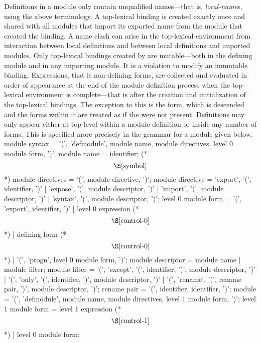 %
\begin{optDefinition}
Definitions in a module only contain unqualified names---that is, {\em
    local-name}s, using the above terminology.  A top-lexical binding is created
exactly once and shared with all modules that import its exported name from the
module that created the binding.  A name clash can arise in the top-lexical
environment from interaction between local definitions and between local
definitions and imported modules.  Only top-lexical bindings created by
 are mutable---both in the defining module and in any
importing module.  It is a violation to modify an immutable binding.
Expressions, that is non-defining forms, are collected and evaluated in order of
appearance at the end of the module definition process when the top-lexical
environment is complete---that is after the creation and initialization of the
top-lexical bindings.  The exception to this is the  form,
which is descended and the forms within it are treated as if the
 were not present.  Definitions may only appear either at
top-level within a module definition or inside any number of 
forms.  This is specified more precisely in the grammar for a module given
below.
%
\Syntax
\savesyntax{}\vbox
{\small%
\syntax
module syntax
   = '(', 'defmodule', module name,
     module directives, {level 0 module form}, ')';
module name
   = identifier; (* \[\S\ref{symbol}\] *)
module directives
   = '(', {module directive}, ')';
module directive
   = 'export', '(', {identifier}, ')'
   | 'expose', '(', {module descriptor}, ')'
   | 'import', '(', {module descriptor}, ')'
   | 'syntax', '(', {module descriptor}, ')';
level 0 module form
   = '(', 'export', {identifier}, ')'
   | level 0 expression (* \[\S\ref{control-0}\] *)
   | defining form (* \[\S\ref{control-0}\] *)
   | '(', 'progn', {level 0 module form}, ')';
module descriptor
   = module name
   | module filter;
module filter
   = '(', 'except', '(', {identifier}, ')',
     module descriptor, ')'
   | '(', 'only', '(', {identifier}, ')',
     module descriptor, ')'
   | '(', 'rename', '(', {rename pair}, ')',
     module descriptor, ')';
rename pair
   = '(', identifier, identifier, ')';
\endsyntax
}
%
\savesyntax{}\vbox{\small
\syntax
module
   = '(', 'defmodule', module name,
     module directives, {level 1 module form}, ')';
level 1 module form
   = level 1 expression (* \[\S\ref{control-1}\] *)
   | level 0 module form;
\endsyntax
}
\label{defmodule-syntax}
%
\end{optDefinition}

